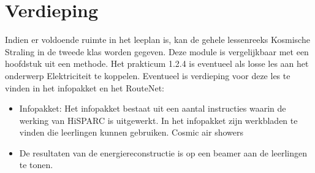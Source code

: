 \section{Verdieping}
Indien er voldoende ruimte in het leeplan is, kan de gehele lessenreeks Kosmische Straling in de tweede klas worden gegeven. Deze module is vergelijkbaar met een hoofdstuk uit een methode. Het prakticum 1.2.4 is eventueel als losse les aan het onderwerp Elektriciteit te koppelen. Eventueel is verdieping voor deze les te vinden in het infopakket en het RouteNet:

\begin{itemize}
\item Infopakket: Het infopakket bestaat uit een aantal instructies waarin de werking van HiSPARC is uitgewerkt. In het infopakket zijn werkbladen te vinden die leerlingen kunnen gebruiken. Cosmic air showers
\item De resultaten van de energiereconstructie is op een beamer aan de leerlingen te tonen.
\end{itemize}


